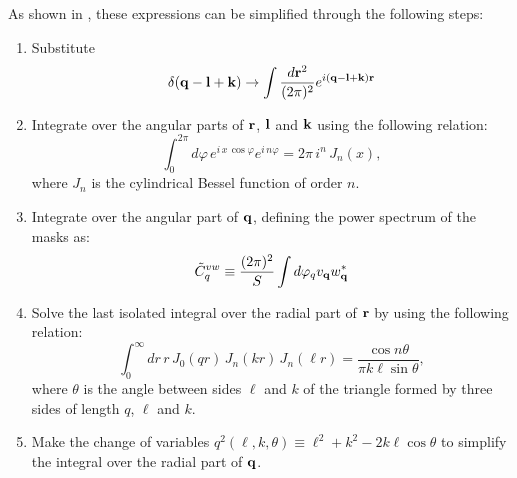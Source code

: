 \documentclass[usenatbib]{mnrasb}
\begin{document}
    As shown in \cite{2016arXiv161204664A}, these expressions can be simplified through the following steps:
    \begin{enumerate}
     \item Substitute
       \begin{equation}
         \delta({\bf q}-{\bf l}+{\bf k})\rightarrow\int\frac{d{\bf r}^2}{(2\pi)^2}e^{i({\bf q}-{\bf l}+{\bf k}){\bf r}}
       \end{equation}
     \item Integrate over the angular parts of ${\bf r}$, ${\bf l}$ and ${\bf k}$ using the following relation:
       \begin{equation}
        \int_0^{2\pi} d\varphi\,e^{i\,x\,\cos\varphi}e^{i\,n\varphi}=2\pi\,i^n\,J_n(x),
       \end{equation}
       where $J_n$ is the cylindrical Bessel function of order $n$.
     \item Integrate over the angular part of ${\bf q}$, defining the power spectrum of the masks as:
       \begin{equation}
         \tilde{C}^{vw}_q\equiv\frac{(2\pi)^2}{S}\int d\varphi_qv_{\bf q}w^*_{\bf q}
       \end{equation}
     \item Solve the last isolated integral over the radial part of ${\bf r}$ by using the following relation:
       \begin{equation}
         \int_0^\infty dr\,r\,J_0(qr)\,J_n(kr)\,J_n(\ell r)=\frac{\cos n\theta}{\pi k\ell\sin\theta},
       \end{equation}
       where $\theta$ is the angle between sides $\ell$ and $k$ of the triangle formed by three sides of length $q$, $\ell$ and $k$.
     \item Make the change of variables $q^2(\ell,k,\theta)\equiv\ell^2+k^2-2k\ell\cos\theta$ to simplify the integral over the radial part of ${\bf q}$.
    \end{enumerate}
    
\end{document}
